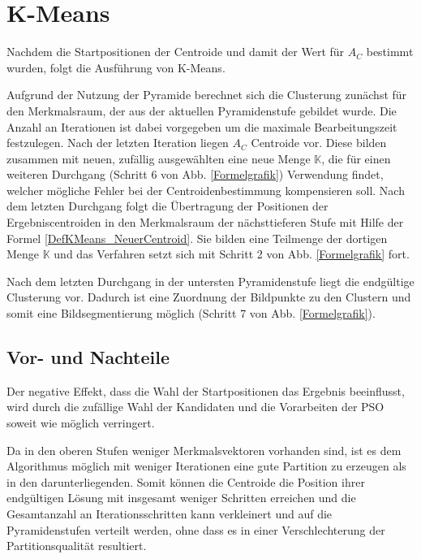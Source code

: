 \section{K-Means}
  Nachdem die Startpositionen der Centroide und damit der Wert für $A_C$ bestimmt wurden, folgt die Ausführung von K-Means.
  
  Aufgrund der Nutzung der Pyramide berechnet sich die Clusterung zunächst für den Merkmalsraum, der aus der aktuellen Pyramidenstufe gebildet wurde. Die Anzahl an Iterationen ist dabei vorgegeben um die maximale Bearbeitungszeit festzulegen.
  Nach der letzten Iteration liegen $A_C$ Centroide vor.
  Diese bilden zusammen mit neuen, zufällig ausgewählten eine neue Menge $\mathbb{K}$, die für einen weiteren Durchgang (Schritt 6 von Abb. \ref{Formelgrafik}) Verwendung findet, welcher mögliche Fehler bei der Centroidenbestimmung kompensieren soll.
  Nach dem letzten Durchgang folgt die Übertragung der Positionen der Ergebniscentroiden in den Merkmalsraum der nächsttieferen Stufe mit Hilfe der Formel \ref{DefKMeans_NeuerCentroid}. Sie bilden eine Teilmenge der dortigen Menge $\mathbb{K}$ und das Verfahren setzt sich mit Schritt 2 von Abb. \ref{Formelgrafik} fort.
  
  Nach dem letzten Durchgang in der untersten Pyramidenstufe liegt die endgültige Clusterung vor. Dadurch ist eine Zuordnung der Bildpunkte zu den Clustern und somit eine Bildsegmentierung möglich (Schritt 7 von Abb. \ref{Formelgrafik}).

\subsection{Vor- und Nachteile}
  Der negative Effekt, dass die Wahl der Startpositionen das Ergebnis beeinflusst, wird durch die zufällige Wahl der Kandidaten und die Vorarbeiten der PSO soweit wie möglich verringert.

  Da in den oberen Stufen weniger Merkmalsvektoren vorhanden sind, ist es dem Algorithmus möglich mit weniger Iterationen eine gute Partition zu erzeugen als in den darunterliegenden. Somit können die Centroide die Position ihrer endgültigen Lösung mit insgesamt weniger Schritten erreichen und die Gesamtanzahl an Iterationsschritten kann verkleinert und auf die Pyramidenstufen verteilt werden, ohne dass es in einer Verschlechterung der Partitionsqualität resultiert.

